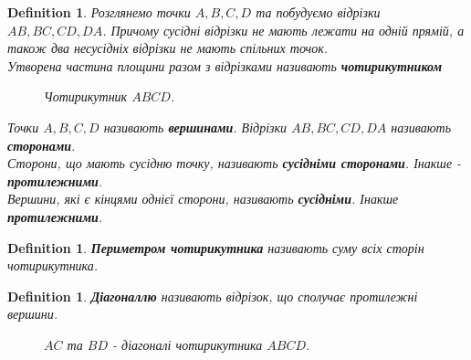 \documentclass[a4paper, 10pt]{article}
\theoremstyle{theoremdd}
\theoremstyle{theoremdd}
\theoremstyle{theoremdd}
\newtheorem{definition}[theorem]{Definition}
\theoremstyle{theoremdd}
\theoremstyle{theoremdd}
\theoremstyle{theoremdd}
\theoremstyle{theoremdd}
\theoremstyle{theoremdd}
\theoremstyle{theoremdd}
\begin{document}
\begin{definition}
Розглянемо точки $A,B,C,D$ та побудуємо відрізки $AB,BC,CD,DA$. Причому сусідні відрізки не мають лежати на одній прямій, а також два несусідніх відрізки не мають спільних точок.\\
Утворена частина площини разом з відрізками називають \textbf{чотирикутником}
\begin{figure}[H]
\centering
{}
\caption*{Чотирикутник $ABCD$.}
\end{figure}
Точки $A,B,C,D$ називають \textbf{вершинами}. Відрізки $AB,BC,CD,DA$ називають \textbf{сторонами}.\\
Сторони, що мають сусідню точку, називають \textbf{сусідніми сторонами}. Інакше - \textbf{протилежними}.\\
Вершини, які є кінцями однієї сторони, називають \textbf{сусідніми}. Інакше \textbf{протилежними}.
\end{definition}

\begin{definition}
\textbf{Периметром чотирикутника} називають суму всіх сторін чотирикутника.
\end{definition}

\begin{definition}
\textbf{Діагоналлю} називають відрізок, що сполучає протилежні вершини.
\begin{figure}[H]
\centering
{}
\caption*{$AC$ та $BD$ - діагоналі чотирикутника $ABCD$.}
\end{figure}
\end{definition}
\end{document}

